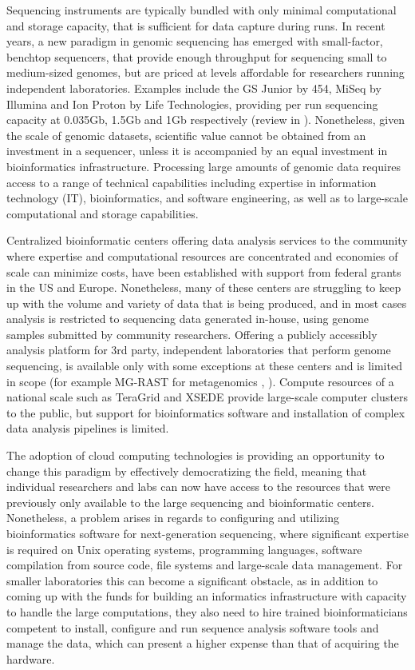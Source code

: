 \documentclass[10pt]{bmc_article}
\newenvironment{bmcformat}{\baselineskip20pt\sloppy\setboolean{publ}{false}}{\baselineskip20pt\sloppy}
\begin{document}
\begin{bmcformat}
Sequencing instruments are typically bundled with only minimal computational and storage capacity, that is sufficient 
for  data capture during runs. In recent years, a new paradigm in genomic sequencing has emerged 
with small-factor, benchtop sequencers, that provide enough throughput for sequencing small to medium-sized 
genomes, but are priced at levels  affordable for researchers running independent  laboratories. Examples include the 
GS Junior by 454, MiSeq by Illumina and Ion Proton by  Life Technologies, providing per run sequencing capacity at 
0.035Gb, 1.5Gb and 1Gb respectively (review in \cite{Loman2012a}). 
Nonetheless, given the scale of genomic datasets, scientific value cannot be obtained from an investment 
in a sequencer, unless it is accompanied by an equal investment in bioinformatics infrastructure. Processing large 
amounts of genomic data requires access to a range of technical capabilities including expertise in information 
technology (IT), bioinformatics, and software engineering, as well as to large-scale computational and storage 
capabilities. \pb

Centralized bioinformatic centers offering data analysis services to the community where expertise and computational 
resources are concentrated and economies of scale can minimize costs, have been established with support from 
federal grants in the US and Europe. Nonetheless, many of these centers are struggling to keep up with the volume and 
variety of data that is being produced, and in most cases analysis is restricted to sequencing data generated 
in-house, using genome samples submitted by community researchers. Offering a publicly accessibly analysis platform 
for 3rd party, independent  laboratories that perform genome sequencing, is available only with some exceptions 
at these centers and is limited in scope (for example MG-RAST for metagenomics \cite{Aziz2010}, \cite{Wilkening2009}). 
Compute resources of a national scale such as TeraGrid \cite{wilkins2008teragrid}  and XSEDE \cite{backmann2012xsede} 
provide large-scale computer clusters to the public, but support for bioinformatics software and installation of complex 
data analysis pipelines is limited. \pb

The adoption of cloud computing technologies is providing an opportunity to change this paradigm by effectively 
democratizing the field, meaning that individual researchers and labs can now have access to the resources that 
were previously only available to the large sequencing and bioinformatic centers. Nonetheless, a problem arises in 
regards to configuring and utilizing bioinformatics software for next-generation sequencing, where significant 
expertise is required on Unix operating systems, programming languages, software compilation from source code, 
file systems and large-scale data management. For smaller laboratories this can become a significant obstacle, as in 
addition to coming up with the funds for building an informatics infrastructure with capacity to handle the large 
computations, they also need to hire trained bioinformaticians competent to install, configure and run sequence 
analysis software tools and manage the data, which can present a higher expense than that of acquiring the hardware. \pb


\end{bmcformat}
\end{document}
